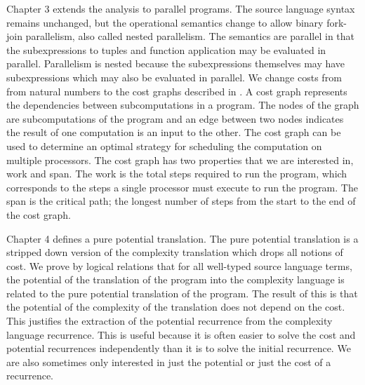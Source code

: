 Chapter 3 extends the analysis to parallel programs. The source language syntax
remains unchanged, but the operational semantics change to allow binary
fork-join parallelism, also called nested parallelism. The semantics are
parallel in that the subexpressions to tuples and function application may be
evaluated in parallel. Parallelism is nested because the subexpressions
themselves may have subexpressions which may also be evaluated in parallel. We
change costs from from natural numbers to the cost graphs described in
\citet{Harper2012PFPL}. A cost graph represents the dependencies between
subcomputations in a program.  The nodes of the graph are subcomputations of
the program and an edge between two nodes indicates the result of one
computation is an input to the other. The cost graph can be used to determine
an optimal strategy for scheduling the computation on multiple processors. The
cost graph has two properties that we are interested in, work and span. The
work is the total steps required to run the program, which corresponds to the
steps a single processor must execute to run the program.  The span is the
critical path; the longest number of steps from the start to the end of the
cost graph.



Chapter 4 defines a pure potential translation. The pure potential translation
is a stripped down version of the complexity translation which drops all
notions of cost. We prove by logical relations that for all well-typed source
language terms, the potential of the translation of the program into the
complexity language is related to the pure potential translation of the
program. The result of this is that the potential of the complexity of the
translation does not depend on the cost. This justifies the extraction of the
potential recurrence from the complexity language recurrence. This is useful
because it is often easier to solve the cost and potential recurrences
independently than it is to solve the initial recurrence. We are also sometimes
only interested in just the potential or just the cost of a recurrence.
